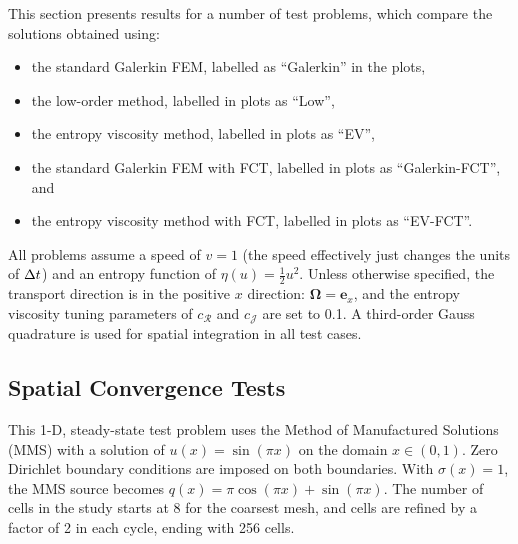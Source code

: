 
This section presents results for a number of test problems, which compare
the solutions obtained using:
\begin{itemize}
  \item the standard Galerkin FEM, labelled as ``Galerkin'' in the plots,
  \item the low-order method, labelled in plots as ``Low'',
  \item the entropy viscosity method, labelled in plots as ``EV'',
  \item the standard Galerkin FEM with FCT, labelled in plots as ``Galerkin-FCT'', and
  \item the entropy viscosity method with FCT, labelled in plots as ``EV-FCT''.
\end{itemize}
All problems assume a speed of $v=1$ (the speed effectively just changes the
units of $\Delta t$) and an entropy function of $\eta(u)=\frac{1}{2}u^2$. Unless
otherwise specified, the transport direction is in the positive
$x$ direction: $\mathbf{\Omega}=\mathbf{e}_x$, and the entropy
viscosity tuning parameters of $c_\mathcal{R}$ and $c_\mathcal{J}$ are set
to 0.1. A third-order Gauss quadrature is used for spatial integration in
all test cases.

\subsection{Spatial Convergence Tests}
This 1-D, steady-state test problem uses the Method of Manufactured Solutions (MMS) with
a solution of $u(x)=\sin(\pi x)$ on the domain $x\in(0,1)$. Zero Dirichlet
boundary conditions are imposed on both boundaries.
With $\sigma(x)=1$,
the MMS source becomes $q(x)=\pi\cos(\pi x) + \sin(\pi x)$.
The number of cells in the study starts at 8 for the coarsest mesh, and cells
are refined by a factor of 2 in each cycle, ending with 256 cells.


